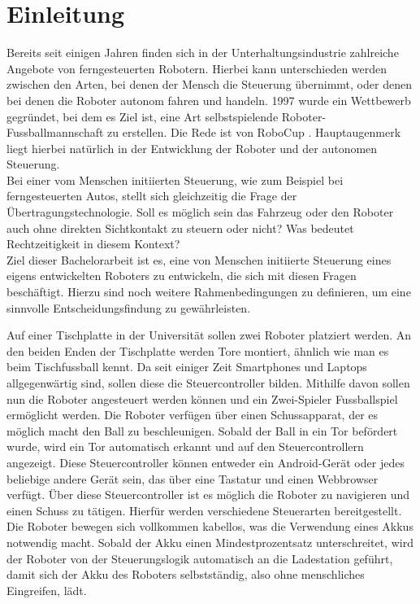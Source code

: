 \chapter{Einleitung}
\label{ch:einleitung}

Bereits seit einigen Jahren finden sich in der Unterhaltungsindustrie zahlreiche Angebote von ferngesteuerten Robotern. Hierbei kann unterschieden werden zwischen den Arten, bei denen der Mensch die Steuerung übernimmt, oder denen bei denen die Roboter autonom fahren und handeln. 1997 wurde ein Wettbewerb gegründet, bei dem es Ziel ist, eine Art selbstspielende Roboter-Fussballmannschaft zu erstellen. Die Rede ist von RoboCup \cite{ROBOCUP}. Hauptaugenmerk liegt hierbei natürlich in der Entwicklung der Roboter und der autonomen Steuerung. \\
Bei einer vom Menschen initiierten Steuerung, wie zum Beispiel bei ferngesteuerten Autos, stellt sich gleichzeitig die Frage der Übertragungstechnologie. Soll es möglich sein das Fahrzeug oder den Roboter auch ohne direkten Sichtkontakt zu steuern oder nicht? Was bedeutet Rechtzeitigkeit in diesem Kontext? \\
Ziel dieser Bachelorarbeit ist es, eine von Menschen initiierte Steuerung eines eigens entwickelten Roboters zu entwickeln, die sich mit diesen Fragen beschäftigt. Hierzu sind noch weitere Rahmenbedingungen zu definieren, um eine sinnvolle Entscheidungsfindung zu gewährleisten.


Auf einer Tischplatte in der Universität sollen zwei Roboter platziert werden. An den beiden Enden der Tischplatte werden Tore montiert, ähnlich wie man es beim Tischfussball kennt. Da seit einiger Zeit Smartphones und Laptops allgegenwärtig sind, sollen diese die Steuercontroller bilden. Mithilfe davon sollen nun die Roboter angesteuert werden können und ein Zwei-Spieler Fussballspiel ermöglicht werden. Die Roboter verfügen über einen Schussapparat, der es möglich macht den Ball zu beschleunigen. Sobald der Ball in ein Tor befördert wurde, wird ein Tor automatisch erkannt und auf den Steuercontrollern angezeigt. Diese Steuercontroller können entweder ein Android-Gerät oder jedes beliebige andere Gerät sein, das über eine Tastatur und einen Webbrowser verfügt. Über diese Steuercontroller ist es möglich die Roboter zu navigieren und einen Schuss zu tätigen. Hierfür werden verschiedene Steuerarten bereitgestellt. 
Die Roboter bewegen sich vollkommen kabellos, was die Verwendung eines Akkus notwendig macht. Sobald der Akku einen Mindestprozentsatz unterschreitet, wird der Roboter von der Steuerungslogik automatisch an die Ladestation geführt, damit sich der Akku des Roboters selbstständig, also ohne menschliches Eingreifen, lädt.\\

